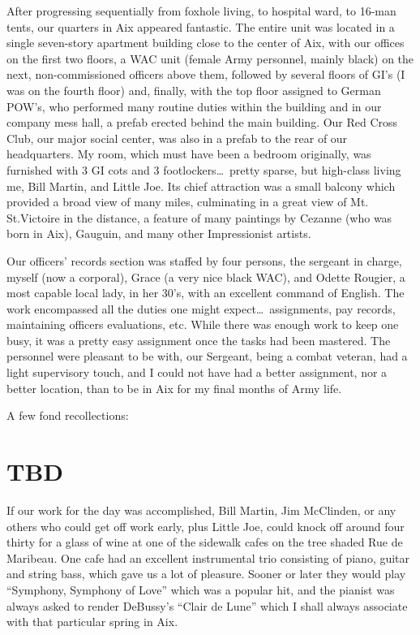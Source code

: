 \documentclass[../m3y]{subfiles}
\begin{document}
After progressing sequentially from foxhole living, to hospital ward, to 16-man tents, our quarters in Aix appeared fantastic. The entire unit was located in a single seven-story apartment building close to the center of Aix, with our offices on the first two floors, a WAC unit (female Army personnel, mainly black) on the next, non-commissioned officers above them, followed by several floors of GI's (I was on the fourth floor) and, finally, with the top floor assigned to German POW's, who performed many routine duties within the building and in our company mess hall, a prefab erected behind the main building. Our Red Cross Club, our major social center, was also in a prefab to the rear of our headquarters. My room, which must have been a bedroom originally, was furnished with 3 GI cots and 3 footlockers\ldots\ pretty sparse, but high-class living me, Bill Martin, and Little Joe. Its chief attraction was a small balcony which provided a broad view of many miles, culminating in a great view of Mt. St.\@ Victoire in the distance, a feature of many paintings by Cezanne (who was born in Aix), Gauguin, and many other Impressionist artists.

Our officers' records section was staffed by four persons, the sergeant in charge, myself (now a corporal), Grace (a very nice black WAC), and Odette Rougier, a most capable local lady, in her 30's, with an excellent command of English. The work encompassed all the duties one might expect\ldots\ assignments, pay records, maintaining officers evaluations, etc\@. While there was enough work to keep one busy, it was a pretty easy assignment once the tasks had been mastered. The personnel were pleasant to be with, our Sergeant, being a combat veteran, had a light supervisory touch, and I could not have had a better assignment, nor a better location, than to be in Aix for my final months of Army life.

A few fond recollections:

\section{TBD}
If our work for the day was accomplished, Bill Martin, Jim McClinden, or any others who could get off work early, plus Little Joe, could knock off around four thirty for a glass of wine at one of the sidewalk cafes on the tree shaded Rue de Maribeau. One cafe had an excellent instrumental trio consisting of piano, guitar and string bass, which gave us a lot of pleasure. Sooner or later they would play ``Symphony, Symphony of Love'' which was a popular hit, and the pianist was always asked to render DeBussy's ``Clair de Lune'' which I shall always associate with that particular spring in Aix.
\end{document}

